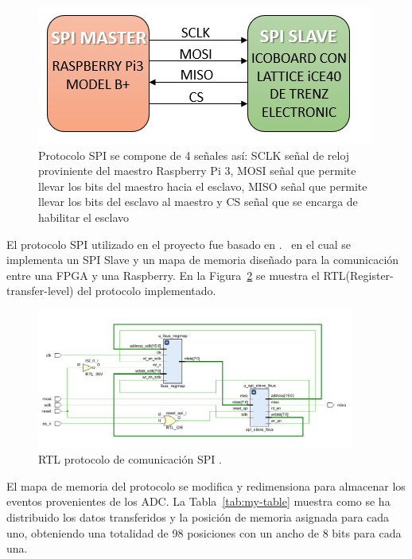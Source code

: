 \begin{figure}[H]
\includegraphics[scale=1]{Figs/SPIPROTO.PNG} 
\centering
\caption[Esquema protocolo SPI]{Protocolo SPI se compone de 4 señales así: SCLK señal de reloj proviniente del maestro Raspberry Pi 3, MOSI señal que permite llevar los bits del maestro hacia el esclavo, MISO señal que permite llevar los bits del esclavo al maestro y CS señal que se encarga de habilitar el esclavo} 
\label{adecuacion}
\end{figure}

El protocolo SPI utilizado en el proyecto fue basado en .~\citep{charkster/spi_slave_verilog_2020} en el cual se implementa un  SPI Slave y un mapa de memoria diseñado para la comunicación entre una FPGA y una Raspberry. En la Figura~\ref{spi} se muestra el RTL(Register-transfer-level) del protocolo implementado.

\begin{figure}[H]
\includegraphics[width=0.93\textwidth]{Figs/rtlproto.PNG} 
\centering
\caption{RTL protocolo de comunicación SPI .~\citep{XilinxInc.2016IntegratedGuide}} 
\label{spi}
\end{figure}

El mapa de memoria del protocolo se modifica y redimensiona para almacenar los eventos provenientes de los ADC.
La Tabla~\ref{tab:my-table} muestra como se ha distribuido los datos transferidos y la posición de memoria asignada para cada uno, obteniendo una totalidad de 98 posiciones con un ancho de 8 bits para cada una.

